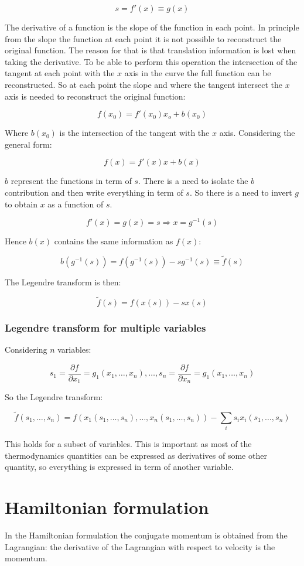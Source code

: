 	$$s = f'(x) \equiv g(x)$$

	The derivative of a function is the slope of the function in each point.
	In principle from the slope the function at each point it is not possible to reconstruct the original function.
	The reason for that is that translation information is lost when taking the derivative.
	To be able to perform this operation the intersection of the tangent at each point with the $x$ axis in the curve the full function can be reconstructed.
	So at each point the slope and where the tangent intersect the $x$ axis is needed to reconstruct the original function:

	$$f(x_0) = f'(x_0)x_o + b(x_0)$$

	Where $b(x_0)$ is the intersection of the tangent with the $x$ axis.
	Considering the general form:

	$$f(x) = f'(x)x+b(x)$$

	$b$ represent the functions in term of $s$.
	There is a need to isolate the $b$ contribution and then write everything in term of $s$.
	So there is a need to invert $g$ to obtain $x$ as a function of $s$.

	$$f'(x) = g(x) = s \Rightarrow x = g^{-1}(s)$$

	Hence $b(x)$ contains the same information as $f(x)$:

	$$b(g^{-1}(s)) = f(g^{-1}(s))-sg^{-1}(s) \equiv\tilde{f}(s)$$

	The Legendre transform is then:

	$$\tilde{f}(s) = f(x(s))-sx(s)$$

		\subsubsection{Legendre transform for multiple variables}
		Considering $n$ variables:

		$$s_1 = \frac{\partial f}{\partial x_1} = g_1(x_1, \dots, x_n), \dots, s_n = \frac{\partial f}{\partial x_n} = g_1(x_1, \dots, x_n)$$

		So the Legendre transform:

		$$\tilde{f}(s_1, \dots, s_n) = f(x_1(s_1, \dots, s_n), \dots, x_n(s_1, \dots, s_n))-\sum\limits_i s_ix_i(s_1, \dots, s_n)$$

		This holds for a subset of variables.
		This is important as most of the thermodynamics quantities can be expressed as derivatives of some other quantity, so everything is expressed in term of another variable.

\section{Hamiltonian formulation}
In the Hamiltonian formulation the conjugate momentum is obtained from the Lagrangian: the derivative of the Lagrangian with respect to velocity is the momentum.


